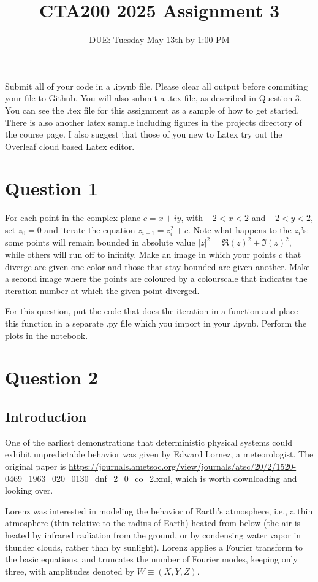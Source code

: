 \documentclass{article}
\title{CTA200 2025 Assignment 3}
\author{DUE: Tuesday May 13th by 1:00 PM}
\date{}
\begin{document}
\maketitle

Submit all of your code in a .ipynb file. Please clear all output before commiting your file to Github. You will also submit a .tex file, as described in Question 3. You can see the .tex file for this assignment as a sample of how to get started. There is also another latex sample including figures in the projects directory of the course page. I also suggest that those of you new to Latex try out the Overleaf cloud based Latex editor.

\section*{Question 1}

For each point in the complex plane $c = x + iy$, with $-2 < x < 2$ and $-2 < y < 2$, set $z_0 = 0$ and iterate the equation $z_{i + 1} = z_i^2 + c$. 
Note what happens to the $z_i$'s: some points will remain bounded in absolute value $|z|^2 = \Re(z)^2 + \Im(z)^2$, while others will run off to infinity. 
Make an image  in which your points $c$ that diverge are given one color and those that stay bounded are given another.
Make a second image where the points are coloured by a colourscale that indicates the iteration number at which the given point diverged.

For this question, put the code that does the iteration in a function and place this function in a separate .py file which you import in your .ipynb.
Perform the plots in the notebook.

\section*{Question 2}

\subsection*{Introduction}
One of the earliest demonstrations that deterministic physical systems could exhibit unpredictable behavior was given by Edward Lornez, a meteorologist. The original paper is \url{https://journals.ametsoc.org/view/journals/atsc/20/2/1520-0469_1963_020_0130_dnf_2_0_co_2.xml}, which is worth downloading and looking over.

Lorenz was interested in modeling the behavior of Earth's atmosphere, i.e., a thin atmosphere (thin relative to the radius of Earth) heated from below (the air is heated by infrared radiation from the ground, or by condensing water vapor in thunder clouds, rather than by sunlight). Lorenz applies a Fourier transform to the basic equations, and truncates the number of Fourier modes, keeping only three, with amplitudes denoted by $W\equiv(X, Y, Z)$.
\end{document}
